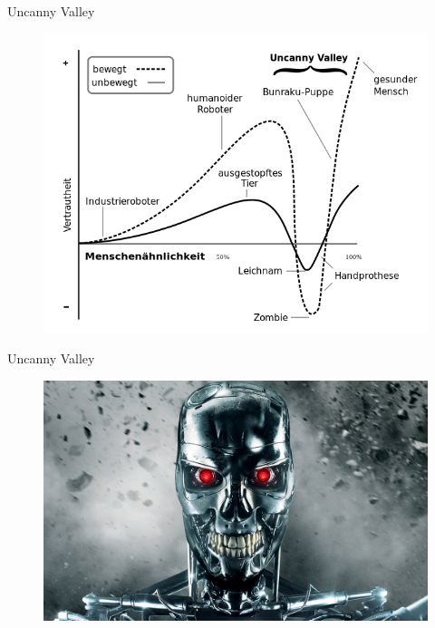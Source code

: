 \documentclass{beamer}
\begin{document}
\begin{frame}{Uncanny Valley}
	\begin{figure}
		\centering
        \includegraphics[width=\textwidth,height=0.8\textheight,keepaspectratio]{figures/uncanny_valley.png}
		\label{fig:uncanny_valley}
	\end{figure}
\end{frame}

\begin{frame}{Uncanny Valley}
	\begin{figure}
		\centering
        \includegraphics[width=\textwidth,height=\textheight,keepaspectratio]{figures/terminator_face.jpg}
		\label{fig:terminator_face}
	\end{figure}
\end{frame}
\end{document}
